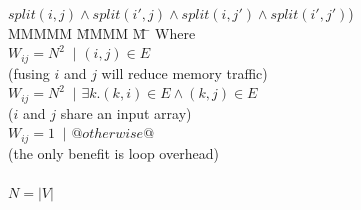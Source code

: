 \begin{tabbing}
           \> \> $ split(i,j) \wedge split(i',j) \wedge split(i,j') \wedge split(i',j') $) \\
MMMMM   \= MMMM \= M \= \kill
Where      \>                                       \\
           \> $W_{ij} = N^2$ \> $~|$ \> $(i,j) \in E $         \\
           \> \> \> (fusing $i$ and $j$ will reduce memory traffic)         \\
           \> $W_{ij} = N^2$ \> $~|$ \> $\exists k. (k,i) \in E \wedge (k,j) \in E $     \\
           \> \> \> ($i$ and $j$ share an input array)                                         \\
           \> $W_{ij} = 1$   \> $~|$ \> $@otherwise@$                                                  \\
           \> \> \> (the only benefit is loop overhead)                                        \\
           \\
           \> $N = |V|$
\end{tabbing}

% 
